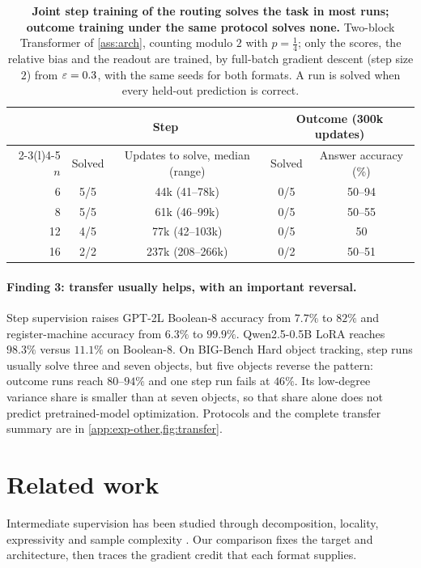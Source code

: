\begin{table}[t]
\caption{\textbf{Joint step training of the routing solves the task in most runs; outcome training under the same protocol solves
none.} Two-block Transformer of \cref{ass:arch}, counting modulo $2$ with $p=\tfrac{1}{4}$; only the scores, the relative bias and the
readout are trained, by full-batch gradient descent (step size $2$) from $\varepsilon=0.3$, with the same seeds for both formats. A run is
solved when every held-out prediction is correct.}
\label{tab:reach}
\centering\small
\begin{tabular}{@{}rcccc@{}}
\toprule
 & \multicolumn{2}{c}{Step} & \multicolumn{2}{c}{Outcome (300k updates)}\\
\cmidrule(lr){2-3}\cmidrule(l){4-5}
$n$ & Solved & Updates to solve, median (range) & Solved & Answer accuracy (\%)\\
\midrule
6  & 5/5 & 44k (41--78k)   & 0/5 & 50--94\\
8  & 5/5 & 61k (46--99k)   & 0/5 & 50--55\\
12 & 4/5 & 77k (42--103k)  & 0/5 & 50\\
16 & 2/2 & 237k (208--266k) & 0/2 & 50--51\\
\bottomrule
\end{tabular}
\end{table}

\paragraph{Finding 3: transfer usually helps, with an important reversal.}
Step supervision raises GPT-2L Boolean-8 accuracy from $7.7\%$ to $82\%$ and register-machine
accuracy from $6.3\%$ to $99.9\%$. Qwen2.5-0.5B LoRA reaches $98.3\%$ versus $11.1\%$
on Boolean-8. On BIG-Bench Hard object tracking, step runs usually solve three and seven
objects, but five objects reverse the pattern: outcome runs reach $80$--$94\%$ and one
step run fails at $46\%$. Its low-degree variance share is smaller than at seven objects,
so that share alone does not predict pretrained-model optimization. Protocols and the
complete transfer summary are in \cref{app:exp-other,fig:transfer}.

\section{Related work}
\label{sec:related}

Intermediate supervision has been studied through decomposition, locality, expressivity and
sample complexity \citep{nye2021scratchpads,wies2023subtask,prystawski2023think,abbe2024globality,
feng2023towards,merrill2024expressive,malach2023autoregressive,hanneke2026samplecomplexityautoregressivereasoning,wen2024sparse}.
Our comparison fixes the target and architecture, then traces the gradient credit that each format supplies.

